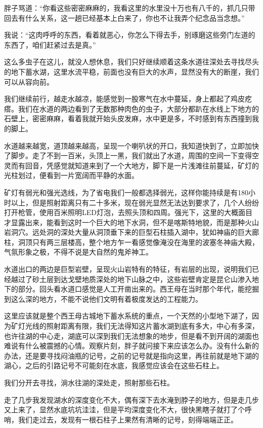 胖子骂道：“你看这些密密麻麻的，我看这里的水里没十万也有八千的，抓几只带回去有什么关系，这一趟已经基本上白来了，你也不让我弄个纪念品当念想。”

我说：“这肉呼呼的东西，看着就恶心，你怎么下得去手，别琢磨这些旁门左道的东西了，咱们赶紧过去是真。”

这么多虫子在这儿，就没人想休息，我们只好继续顺着这条水道往深处去寻找尽头的地下蓄水湖，这里水流平稳，前面也没有巨大的水声，显然没有大的断崖，我们可以从容向前。

我们继续前行，越走水越凉，能感觉到一股寒气在水中蔓延，身上都起了鸡皮疙瘩。我们在水道的两边看到了无数那种肉色的虫子，大部分都趴在水线上下地方的石壁上，密密麻麻，看着我就开始头皮发麻，水中更是多，不时感到有东西撞到我的脚上。

水道越来越宽，道顶越来越高，呈现一个喇叭状的开口，我知道快到了，立即加快了脚步。走了不到一百米，头顶上一黑，我们就出了水道，周围的空间一下变得空灵而有回音，凭感觉就知道来到了一个大地方，脚下是一片浅滩往前蔓延，矿灯的光柱划过，便看到一片宽阔而平静的水面。

矿灯有弱光和强光选线，为了省电我们一般都选择弱光，这样你能持续是有180小时以上，但是照射距离只有二十多米，现在弱光显然无法达到要求了，几个人纷纷打开枪管，使用百米照明LED灯泡，去照头顶和四周。强光下，这里的大概面目才显露出来，能看到这时一个巨大的地下水洞，但不是喀斯特地貌，而是那种火山岩洞穴。远处洞的深处大量从洞顶垂下来的巨型石柱插入湖中，犹如神庙的巨大廊柱，洞顶只有两三层楼高，整个地方乍一看感觉像淹没在海里的波塞冬神庙大殿，气氛形象之极，不得不说是大自然的鬼斧神工。

水道出口的两边是巨型岩壁，呈现火山岩特有的特征，有岩层的出现，说明我们已经越过了砂土层到达戈壁地质深处的地下山脉之中，这些岩壁肯定是昆仑山渗入地下的部分。回头看水道口感觉是人工开凿出来的。西王母在当时那个年代，能挖掘到这么深的地方，不能不说他们文明有着极度发达的工程能力。

这里应该就是整个西王母古城地下蓄水系统的重点，一个天然的小型地下湖了，因为矿灯光线的照射距离有限，我们无法得知这片蓄水湖到底有多大，中心有多深，也许往湖的中心走，湖底可以深到我们无法想象的地步，但是看不到开阔的湖面也难说有什么被震撼的心情。观察片刻，胖子就问接下来应该怎么办。没有什么新的办法，还是要寻找闷油瓶的记号，之前的记号就是指向这里，再往前就是地下湖的湖心，之后的引路记号不可能刻在水底，我感觉应该会在这些石柱上。

我们分开去寻找，淌水往湖的深处走，照射那些石柱。

走了几步我发现湖水的深度变化不大，偶有深下去水淹到脖子的地方，但是走几步又上来了，显然水底坑坑洼洼，但是平均深度变化不大，很快黑瞎子就打了个呼哨，我们走过去，发现有一根石柱子上果然有清晰的记号，刻得端端正正。

